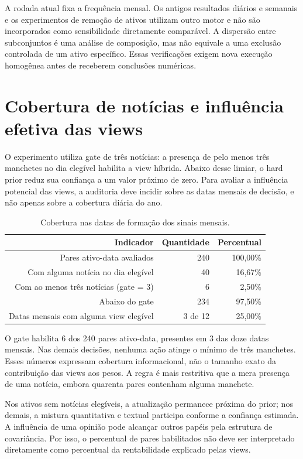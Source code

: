 A rodada atual fixa a frequência mensal. Os antigos resultados diários e semanais e os experimentos de remoção de ativos utilizam outro motor e não são incorporados como sensibilidade diretamente comparável. A dispersão entre subconjuntos é uma análise de composição, mas não equivale a uma exclusão controlada de um ativo específico. Essas verificações exigem nova execução homogênea antes de receberem conclusões numéricas.

\clearpage
\section{Cobertura de notícias e influência efetiva das views}
O experimento utiliza gate de três notícias: a presença de pelo menos três manchetes no dia elegível habilita a view híbrida. Abaixo desse limiar, o hard prior reduz sua confiança a um valor próximo de zero. Para avaliar a influência potencial das views, a auditoria deve incidir sobre as datas mensais de decisão, e não apenas sobre a cobertura diária do ano.

\begin{table}[H]
\centering
\caption{Cobertura nas datas de formação dos sinais mensais.}
{\footnotesize
\begin{tabular}{@{}rrr@{}}
\hline
Indicador & Quantidade & Percentual \\ \hline
Pares ativo-data avaliados & 240 & 100,00\% \\
Com alguma notícia no dia elegível & 40 & 16,67\% \\
Com ao menos três notícias (gate = 3) & 6 & 2,50\% \\
Abaixo do gate & 234 & 97,50\% \\
Datas mensais com alguma view elegível & 3 de 12 & 25,00\% \\
\hline
\end{tabular}}
\par{}
\end{table}
O gate habilita 6 dos 240 pares ativo-data, presentes em 3 das doze datas mensais. Nas demais decisões, nenhuma ação atinge o mínimo de três manchetes. Esses números expressam cobertura informacional, não o tamanho exato da contribuição das views aos pesos. A regra é mais restritiva que a mera presença de uma notícia, embora quarenta pares contenham alguma manchete.

Nos ativos sem notícias elegíveis, a atualização permanece próxima do prior; nos demais, a mistura quantitativa e textual participa conforme a confiança estimada. A influência de uma opinião pode alcançar outros papéis pela estrutura de covariância. Por isso, o percentual de pares habilitados não deve ser interpretado diretamente como percentual da rentabilidade explicado pelas views.

